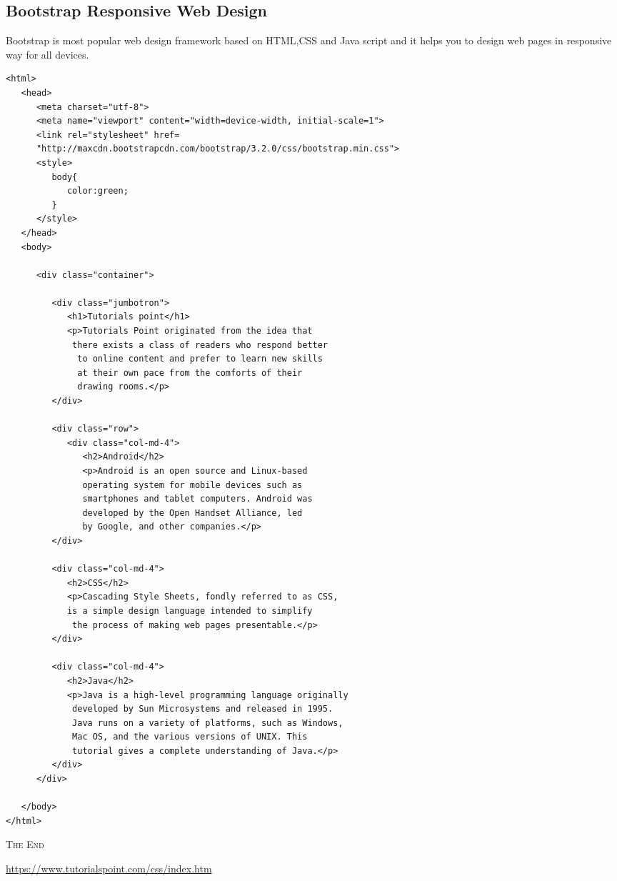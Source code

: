 \documentclass[a4paper,oneside]{book}
\numberwithin{equation}{chapter}
\begin{document}
\subsection{Bootstrap Responsive Web Design}
Bootstrap is most popular web design framework based on HTML,CSS and Java script and it helps you to design web pages in responsive way for all devices.
\begin{verbatim}
<html>
   <head>
      <meta charset="utf-8">
      <meta name="viewport" content="width=device-width, initial-scale=1">
      <link rel="stylesheet" href=
      "http://maxcdn.bootstrapcdn.com/bootstrap/3.2.0/css/bootstrap.min.css">
      <style>
         body{
            color:green;
         }
      </style>
   </head>
   <body>
   
      <div class="container">
      
         <div class="jumbotron">
            <h1>Tutorials point</h1> 
            <p>Tutorials Point originated from the idea that
             there exists a class of readers who respond better
              to online content and prefer to learn new skills
              at their own pace from the comforts of their 
              drawing rooms.</p> 
         </div>
      
         <div class="row">
            <div class="col-md-4">
               <h2>Android</h2>
               <p>Android is an open source and Linux-based 
               operating system for mobile devices such as 
               smartphones and tablet computers. Android was 
               developed by the Open Handset Alliance, led 
               by Google, and other companies.</p>
         </div>
         
         <div class="col-md-4">
            <h2>CSS</h2>
            <p>Cascading Style Sheets, fondly referred to as CSS, 
            is a simple design language intended to simplify
             the process of making web pages presentable.</p>
         </div>
      
         <div class="col-md-4">
            <h2>Java</h2>
            <p>Java is a high-level programming language originally
             developed by Sun Microsystems and released in 1995.
             Java runs on a variety of platforms, such as Windows,
             Mac OS, and the various versions of UNIX. This 
             tutorial gives a complete understanding of Java.</p>
         </div>
      </div>
      
   </body>
</html>
\end{verbatim}
\vspace{2cm}
\begin{center}
\textsc{The End}
\end{center}
\begin{thebibliography}{999}
 \url{https://www.tutorialspoint.com/css/index.htm}
\end{thebibliography}
\end{document}
